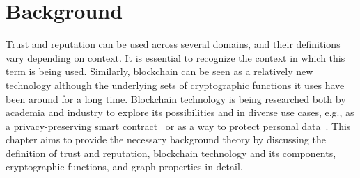 \chapter{Background} \label{ch:background}
Trust and reputation can be used across several domains, and their definitions
vary depending on context. It is essential to recognize the context in which
this term is being used. Similarly, blockchain can be seen as a relatively new
technology although the underlying sets of cryptographic functions it uses have
been around for a long time. Blockchain technology is being researched both by
academia and industry to explore its possibilities and in diverse use cases,
e.g., as a privacy-preserving smart contract~\cite{kosba2016hawk} or as a way
to protect personal data~\cite{zyskind2015decentralizing}. This chapter aims to
provide the necessary background theory by discussing the definition of trust
and reputation, blockchain technology and its components, cryptographic
functions, and graph properties in detail. 
